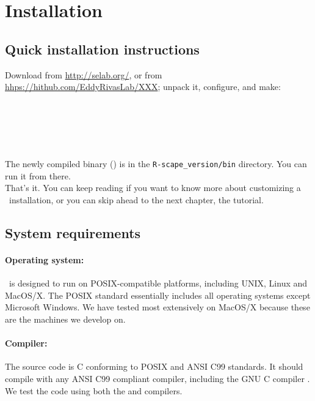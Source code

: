 \section{Installation}
\label{section:installation}
\setcounter{footnote}{0}

\subsection{Quick installation instructions}

Download  from \url{http://selab.org/}, or
from
\url{hhps://hithub.com/EddyRivasLab/XXX};
unpack it, configure, and make:

\\
\\
\\ 
\\

The newly compiled binary () is in the
\texttt{R-scape\_version/bin} directory. You can run it from there.\\

That's it.  You can keep reading if you want to know more about
customizing a \rscape\ installation, or you can skip ahead to the next
chapter, the tutorial.


\subsection{System requirements}

\paragraph{Operating system:} \rscape\ is designed to run on
POSIX-compatible platforms, including UNIX, Linux and MacOS/X. The
POSIX standard essentially includes all operating systems except
Microsoft Windows. We have tested most extensively on MacOS/X because
these are the machines we develop on.

\paragraph{Compiler:} The source code is C conforming to POSIX and ANSI
C99 standards. It should compile with any ANSI C99 compliant compiler,
including the GNU C compiler . We test the code using both
the  and  compilers. 

